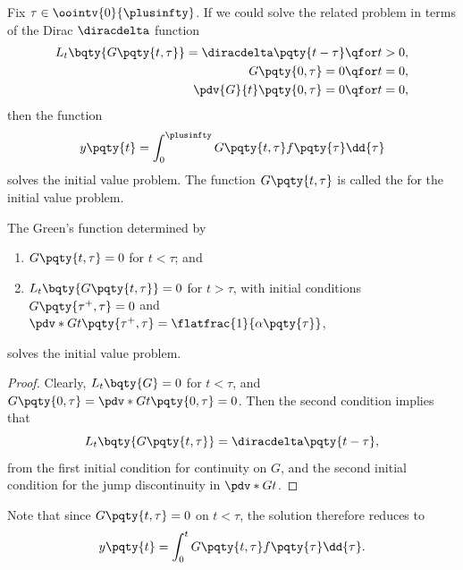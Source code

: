 Fix \(\tau \in \oointv{0}{\plusinfty}\). If we could solve the related problem in terms of the Dirac \(\diracdelta\) function
\begin{subequations}
    \begin{align}
        L_t \bqty{G\pqty{t, \tau}} = \diracdelta\pqty{t - \tau} & \qfor t > 0, \\
        G\pqty{0, \tau} = 0 & \qfor t = 0, \\
        \pdv{G}{t} \pqty{0, \tau} = 0 & \qfor t = 0,
    \end{align}
\end{subequations}
then the function
\begin{equation}
    y\pqty{t} = \int_{0}^{\plusinfty} G\pqty{t, \tau} f\pqty{\tau} \dd{\tau}
\end{equation}
solves the initial value problem. The function \(G\pqty{t, \tau}\) is called the  for the initial value problem.

\begin{proposition}
    The Green's function determined by
    \begin{enumerate}[label=(\alph*)]
        \item \(G\pqty{t, \tau} = 0\) for \(t < \tau\); and
        \item \(L_t \bqty{G\pqty{t, \tau}} = 0\) for \(t > \tau\), with initial conditions \(G\pqty{\tau^+, \tau} = 0\) and \(\pdv*{G}{t} \pqty{\tau^+, \tau} = \flatfrac{1}{\alpha\pqty{\tau}}\),
    \end{enumerate}
    solves the initial value problem.
\end{proposition}

\begin{proof}
    Clearly, \(L_t\bqty{G} = 0\) for \(t < \tau\), and \(G\pqty{0, \tau} = \pdv*{G}{t} \pqty{0, \tau} = 0\). Then the second condition implies that
    \begin{equation}
        L_t \bqty{G\pqty{t, \tau}} = \diracdelta\pqty{t - \tau},
    \end{equation}
    from the first initial condition for continuity on \(G\), and the second initial condition for the jump discontinuity in \(\pdv*{G}{t}\).
\end{proof}

Note that since \(G\pqty{t, \tau} = 0\) on \(t < \tau\), the solution therefore reduces to
\begin{equation}
    y\pqty{t} = \int_{0}^{t} G\pqty{t, \tau} f\pqty{\tau} \dd{\tau}.
\end{equation}

